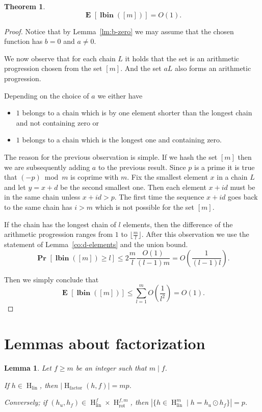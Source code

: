 \documentclass{article}
\newcommand{\hlinr}[1]{\operatorname{H}_{\operatorname{lin}}^{#1}}
\newcommand{\hlin}{\operatorname{H}_{\operatorname{lin}}}
\newcommand{\hfact}[2]{\operatorname{H}_{\operatorname{factor}}({#1}, {#2})}
\newcommand{\rot}[2]{\operatorname{H}_{\operatorname{rot}}^{{#1}, {#2}}}
\newcommand{\vlbin}[1]{\operatorname{\mathbf{lbin}}({#1})}
\newcommand{\probs}[2]{\operatorname{\mathbf{Pr}}_{{#1}}\left[{#2}\right]}
\newcommand{\prob}[1]{\probs{}{#1}}
\newcommand{\expects}[2]{\operatorname{\mathbf{E}}_{{#1}}\left[{#2}\right]}
\newcommand{\expect}[1]{\expects{}{#1}}
\newtheorem{lemma}{Lemma}
\newtheorem{theorem}{Theorem}
\begin{document}
\begin{theorem}
\[
\expect{\vlbin{[m]}} = O(1).
\]
\end{theorem}
\begin{proof}
Notice that by Lemma~\ref{lm:b-zero} we may assume that the chosen function has $b = 0$ and $a \neq 0$.

We now observe that for each chain $L$ it holds that the set is an arithmetic progression chosen from the set $[m]$.
And the set $aL$ also forms an arithmetic progression.

Depending on the choice of $a$ we either have
\begin{itemize}
  \item $1$ belongs to a chain which is by one element shorter than the longest chain and not containing zero or
  \item $1$ belongs to a chain which is the longest one and containing zero.
\end{itemize}

The reason for the previous observation is simple. If we hash the set $[m]$ then we are subsequently adding $a$ to the previous result.
Since $p$ is a prime it is true that $(-p) \bmod m$ is coprime with $m$.
Fix the smallest element $x$ in a chain $L$ and let $y = x + d$ be the second smallest one.
Then each element $x + id$ must be in the same chain unless $x + id > p$.
The first time the sequence $x + id$ goes back to the same chain has $i > m$ which is not possible for the set $[m]$.

If the chain has the longest chain of $l$ elements, then the difference of the arithmetic progression ranges from $1$ to $\lfloor \frac{m}{l} \rfloor$.
After this observation we use the statement of Lemma~\ref{co:d-elements} and the union bound.
\[
\prob{\vlbin{[m]} \geq l} \leq 2 \frac{m}{l} \frac{O(1)}{(l - 1)m} = O\left(\frac{1}{(l - 1)l}\right).
\]

Then we simply conclude that
\[
\expect{\vlbin{[m]}} \leq \sum_{l = 1}^m O\left(\frac{1}{l^2}\right) = O(1).
\]

\end{proof}


\section{Lemmas about factorization}
\begin{lemma}
Let $f \geq m$ be an integer such that $m \mid f$.

If $h \in \hlin$, then $|\hfact{h}{f}| = m p$.

Conversely; if $(h_u, h_f) \in \hlinr{f} \times \rot{f}{m}$, then $|\{h \in \hlinr{m} \mid h = h_u \odot h_f \}| = p$.
\end{lemma}
\end{document}

